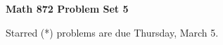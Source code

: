 \documentclass[12pt]{article}
\begin{document}
\def\ctln{\centerline}
\def\msk{\medskip}
\def\bsk{\bigskip}
\def\ssk{\smallskip}
\def\hsk{\hskip.3in}
\def\ra{\rightarrow}
\def\ubr{\underbar}

\def\mt{{\mathcal T}}
\def\mb{{\mathcal B}}
\def\ms{{\mathcal S}}
\def\mu{{\mathcal U}}
\def\mv{{\mathcal V}}

\def\bbr{{\mathbb R}}
\def\bbz{{\mathbb Z}}
\def\bbq{{\mathbb Q}}
\def\spc{$~$\hskip.15in$~$}

\def\sset{\subseteq}
\def\del{\partial}
\def\lra{$\Leftrightarrow$}
\def\bra{$\Rightarrow$}
\def\wtl{\widetilde}



\ctln{\bf Math 872 Problem Set 5}

\msk

Starred (*) problems are due Thursday, March 5.
\end{document}

